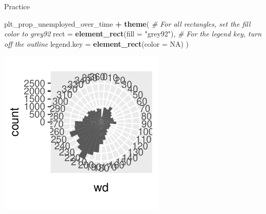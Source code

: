 \documentclass[
  ignorenonframetext,
]{beamer}
\newenvironment{Shaded}{\begin{snugshade}}{\end{snugshade}}
\newcommand{\AttributeTok}[1]{\textcolor[rgb]{0.13,0.29,0.53}{#1}}
\newcommand{\CommentTok}[1]{\textcolor[rgb]{0.56,0.35,0.01}{\textit{#1}}}
\newcommand{\ConstantTok}[1]{\textcolor[rgb]{0.56,0.35,0.01}{#1}}
\newcommand{\FunctionTok}[1]{\textcolor[rgb]{0.13,0.29,0.53}{\textbf{#1}}}
\newcommand{\NormalTok}[1]{#1}
\newcommand{\SpecialCharTok}[1]{\textcolor[rgb]{0.81,0.36,0.00}{\textbf{#1}}}
\newcommand{\StringTok}[1]{\textcolor[rgb]{0.31,0.60,0.02}{#1}}
\begin{document}
\begin{frame}[fragile]{Practice}
\label{practice-4}

\begin{Shaded}
\begin{Highlighting}[]
\NormalTok{plt\_prop\_unemployed\_over\_time }\SpecialCharTok{+}
  \FunctionTok{theme}\NormalTok{(}
    \CommentTok{\# For all rectangles, set the fill color to grey92}
    \AttributeTok{rect =} \FunctionTok{element\_rect}\NormalTok{(}\AttributeTok{fill =} \StringTok{"grey92"}\NormalTok{),}
    \CommentTok{\# For the legend key, turn off the outline}
    \AttributeTok{legend.key =} \FunctionTok{element\_rect}\NormalTok{(}\AttributeTok{color =} \ConstantTok{NA}\NormalTok{)}
\NormalTok{  )}
\end{Highlighting}
\end{Shaded}

\begin{center}\includegraphics[width=0.5\linewidth]{Figs/unnamed-chunk-70-1} \end{center}
\end{frame}
\end{document}
